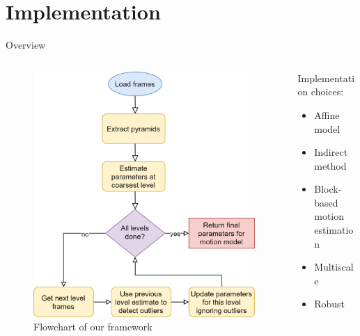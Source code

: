 \documentclass[aspectratio=1610,xcolor=dvipsnames]{beamer}
\begin{document}
\section{Implementation}
\begin{frame}{Overview}
    \begin{columns}
        \begin{column}{0.45\textwidth}
            \begin{figure}[H]
                \includegraphics[keepaspectratio,width=.9\textwidth]{images/implementation-flow.png}
                \caption{Flowchart of our framework}
            \end{figure}
        \end{column}
        \begin{column}{0.45\textwidth}
            Implementation choices:
            \begin{itemize}
                \item Affine model
                \item Indirect method
                \item Block-based motion estimation
                \item Multiscale
                \item Robust
            \end{itemize}
        \end{column}
    \end{columns}
\end{frame}
\end{document}
